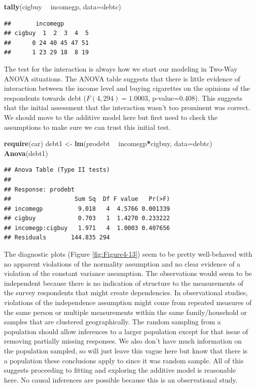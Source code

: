 \documentclass[]{book}
\newenvironment{Shaded}{\begin{snugshade}}{\end{snugshade}}
\newcommand{\KeywordTok}[1]{\textcolor[rgb]{0.13,0.29,0.53}{\textbf{#1}}}
\newcommand{\DataTypeTok}[1]{\textcolor[rgb]{0.13,0.29,0.53}{#1}}
\newcommand{\StringTok}[1]{\textcolor[rgb]{0.31,0.60,0.02}{#1}}
\newcommand{\OperatorTok}[1]{\textcolor[rgb]{0.81,0.36,0.00}{\textbf{#1}}}
\newcommand{\NormalTok}[1]{#1}
\theoremstyle{definition}
\theoremstyle{definition}
\theoremstyle{remark}
\begin{document}
\begin{Shaded}
\begin{Highlighting}[]
\KeywordTok{tally}\NormalTok{(cigbuy }\OperatorTok{~}\StringTok{ }\NormalTok{incomegp, }\DataTypeTok{data=}\NormalTok{debtc)}
\end{Highlighting}
\end{Shaded}

\begin{verbatim}
##       incomegp
## cigbuy  1  2  3  4  5
##      0 24 40 45 47 51
##      1 23 29 18  8 19
\end{verbatim}

The test for the interaction is always how we start our modeling in
Two-Way ANOVA situations. The ANOVA table suggests that there is little
evidence of interaction between the income level and buying cigarettes
on the opinions of the respondents towards debt (\(F(4,294)=1.0003\),
p-value=0.408). This suggests that the initial assessment that the
interaction wasn't too prominent was correct. We should move to the
additive model here but first need to check the assumptions to make sure
we can trust this initial test.

\begin{Shaded}
\begin{Highlighting}[]
\KeywordTok{require}\NormalTok{(car)}
\NormalTok{debt1 <-}\StringTok{ }\KeywordTok{lm}\NormalTok{(prodebt }\OperatorTok{~}\StringTok{ }\NormalTok{incomegp}\OperatorTok{*}\NormalTok{cigbuy, }\DataTypeTok{data=}\NormalTok{debtc)}
\KeywordTok{Anova}\NormalTok{(debt1)}
\end{Highlighting}
\end{Shaded}

\begin{verbatim}
## Anova Table (Type II tests)
## 
## Response: prodebt
##                  Sum Sq  Df F value   Pr(>F)
## incomegp          9.018   4  4.5766 0.001339
## cigbuy            0.703   1  1.4270 0.233222
## incomegp:cigbuy   1.971   4  1.0003 0.407656
## Residuals       144.835 294
\end{verbatim}

The diagnostic plots (Figure \ref{fig:Figure4-13}) seem to be pretty
well-behaved with no apparent violations of the normality assumption and
no clear evidence of a violation of the constant variance assumption.
The observations would seem to be independent because there is no
indication of structure to the measurements of the survey respondents
that might create dependencies. In observational studies, violations of
the independence assumption might come from repeated measures of the
same person or multiple measurements within the same family/household or
samples that are clustered geographically. The random sampling from a
population should allow inferences to a larger population except for
that issue of removing partially missing responses. We also don't have
much information on the population sampled, so will just leave this
vague here but know that there is a population these conclusions apply
to since it was random sample. All of this suggests proceeding to
fitting and exploring the additive model is reasonable here. No causal
inferences are possible because this is an observational study.
\end{document}
